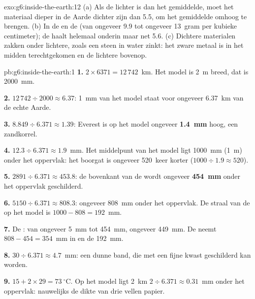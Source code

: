 \begin{solution}{exo:g6:inside-the-earth:12}
(a) Als de  lichter is dan het gemiddelde, moet het materiaal
dieper in de Aarde dichter zijn dan 5.5, om het gemiddelde omhoog te
brengen. (b) In de  en de  (van ongeveer 9.9 tot
ongeveer 13~gram per kubieke centimeter); de  haalt helemaal onderin
maar net 5.6. (c) Dichtere materialen zakken onder lichtere, zoals een
steen in water zinkt: het zware metaal is in het midden terechtgekomen en
de lichtere  bovenop.
\end{solution}

\begin{solution}{pb:g6:inside-the-earth:1}
\textbf{1.} $2 \times 6371 = 12\,742$~km. Het model is 2~m breed, dat is
2000~mm.

\textbf{2.} $12\,742 \div 2000 \approx 6.37$: 1~mm van het model staat voor
ongeveer 6.37~km van de echte Aarde.

\textbf{3.} $8.849 \div 6.371 \approx 1.39$: Everest is op het model
ongeveer \textbf{1.4~mm} hoog, een zandkorrel.

\textbf{4.} $12.3 \div 6.371 \approx 1.9$~mm. Het middelpunt van het model
ligt 1000~mm (1~m) onder het oppervlak: het boorgat is ongeveer 520~keer
korter ($1000 \div 1.9 \approx 520$).

\textbf{5.} $2891 \div 6.371 \approx 453.8$: de bovenkant van de 
wordt ongeveer \textbf{454~mm} onder het oppervlak geschilderd.

\textbf{6.} $5150 \div 6.371 \approx 808.3$: ongeveer 808~mm onder het
oppervlak. De straal van de  op het model is $1000 - 808 = 192$~mm.

\textbf{7.} De : van ongeveer 5~mm tot 454~mm, ongeveer 449~mm. De
 neemt $808 - 454 = 354$~mm in en de  192~mm.

\textbf{8.} $30 \div 6.371 \approx 4.7$~mm: een dunne band, die met een
fijne kwast geschilderd kan worden.

\textbf{9.} $15 + 2 \times 29 = 73~^\circ$C. Op het model ligt 2~km
$2 \div 6.371 \approx 0.31$~mm onder het oppervlak: nauwelijks de dikte van
drie vellen papier.


\end{solution}
